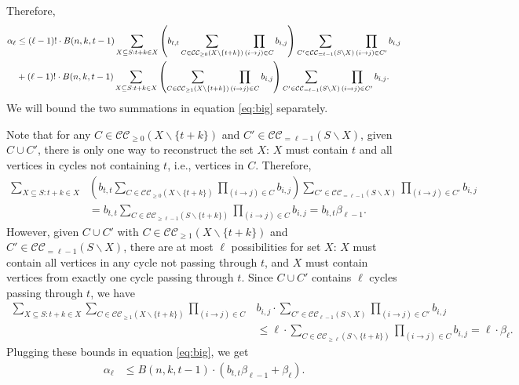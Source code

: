 \documentclass[11pt]{article}
\makeatletter
\theoremstyle{definition}
\newenvironment{proof}[1][\protect\proofname]{\par
	\normalfont\topsep6\p@\@plus6\p@\relax
	\trivlist
	\itemindent\parindent        %
	\item[\hskip\labelsep\scshape #1]\ignorespaces
}{%
	\endtrivlist\@endpefalse
}
\providecommand{\proofname}{Proof}
\makeatother
\begin{document}
\begin{proof}
Therefore, 
\begin{align}
        \alpha_{\ell} 
        &\leq (\ell-1)! \cdot B(n, k, t-1)  \sum_{X \subseteq S: t+k \in X}     \left( b_{t,t} \sum_{C \in \mathcal{CC}_{\geq 0}(X \backslash \{t+k\})} \prod_{(i\rightarrow j) \in C} b_{i,j}\right)  \sum_{C' \in \mathcal{CC}_{=\ell-1}(S \backslash X)} \prod_{(i\rightarrow j) \in C'} b_{i,j} \notag\\
        &+(\ell-1)! \cdot B(n, k, t-1)  \sum_{X \subseteq S: t+k \in X}    \left( \sum_{C \in \mathcal{CC}_{\geq 1}(X\backslash \{t+k\})} \prod_{(i\rightarrow j) \in C} b_{i,j}\right)  \sum_{C' \in \mathcal{CC}_{=\ell-1}(S \backslash X)} \prod_{(i\rightarrow j) \in C'} b_{i,j} . \label{eq:big}
    \end{align}
    We will bound the two summations in equation \eqref{eq:big} separately.
    
    
    Note that for any $C\in \mathcal{CC}_{\geq 0}(X \backslash \{t+k\})$ and $C' \in \mathcal{CC}_{= \ell-1}(S\backslash X)$, given $C \cup C'$, there is only one way to reconstruct the set $X$: $X$ must contain $t$ and all vertices in cycles not containing $t$, i.e., vertices in $C$. Therefore, 
    \begin{align*}
         \sum_{X \subseteq S: t+k \in X}   &\left( b_{t,t} \sum_{C \in \mathcal{CC}_{\geq 0}(X \backslash \{ t+k\})} \prod_{(i\rightarrow j) \in C} b_{i,j}\right)  \sum_{C' \in \mathcal{CC}_{=\ell-1}(S \backslash X)} \prod_{(i\rightarrow j) \in C'} b_{i,j} \\
         &= b_{t,t} \sum_{C\in \mathcal{CC}_{\geq \ell-1}(S \backslash \{t+k\}) } \prod_{(i\rightarrow j) \in C} b_{i,j} = b_{t,t} \beta_{\ell-1}.
    \end{align*}
    However, given $C \cup C'$ with $C\in \mathcal{CC}_{\geq 1}(X \backslash \{t+k\})$ and $C' \in \mathcal{CC}_{= \ell-1}(S\backslash X)$, there are at most $\ell$ possibilities for set $X$: $X$ must contain all vertices in any cycle not passing through $t$, and $X$ must contain vertices from exactly one cycle passing through $t$. Since $C \cup C'$ contains $\ell$ cycles passing through $t$, we have
    \begin{align*}
         \sum_{X \subseteq S: t+k \in X}  \sum_{C \in \mathcal{CC}_{\geq 1}(X \backslash \{t+k\})} \prod_{(i\rightarrow j) \in C}& b_{i,j} \cdot  \sum_{C' \in \mathcal{CC}_{\ell-1}(S \backslash X)} \prod_{(i\rightarrow j) \in C'} b_{i,j} \\
         &\leq \ell\cdot  \sum_{C\in \mathcal{CC}_{\geq \ell}(S \backslash \{t+k\}) } \prod_{(i\rightarrow j) \in C} b_{i,j} 
         = \ell \cdot \beta_{\ell}.
    \end{align*}
    Plugging these bounds in equation \eqref{eq:big}, we get 
    \begin{align*}
        \alpha_{\ell} 
        &\leq B(n, k, t-1) \cdot  \left( b_{t,t} \beta_{\ell-1} + \beta_{\ell}\right).
    \end{align*}
    

\end{proof}
\end{document}
